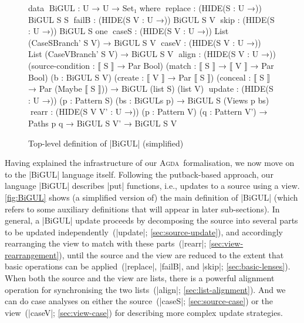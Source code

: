 \documentclass{sigplanconf}
\newcommand{\Agda}{\textsc{Agda}}
\newcommand{\beforefigure}{\setlength{\mathindent}{0em}}
\begin{document}
\begin{figure}
\beforefigure
\begin{code}
data ^^^BiGUL : U → U → Set₁ where
  ^^^replace  :  (HIDE({S : U} →))    BiGUL S S
  ^^^failB    :  (HIDE({S V : U} →))  BiGUL S V
  ^^^skip     :  (HIDE({S : U} →))    BiGUL S one
  ^^^caseS    :  (HIDE({S V : U} →))  List (CaseSBranch'  S V) → BiGUL S V
  ^^^caseV    :  (HIDE({S V : U} →))  List (CaseVBranch'  S V) → BiGUL S V
  ^^^align    :  (HIDE({S V : U} →))  (source-condition : ⟦ S ⟧ → Par Bool)
                                      (match : ⟦ S ⟧ → ⟦ V ⟧ → Par Bool)
                                      (b : BiGUL S V)
                                      (create : ⟦ V ⟧ → Par ⟦ S ⟧)
                                      (conceal : ⟦ S ⟧ → Par (Maybe ⟦ S ⟧)) →
                                      BiGUL (list S) (list V)
  ^^^update   :  (HIDE({S : U} →))    (p : Pattern S) (bs : BiGULs p) →
                                      BiGUL S (Views p bs)
  ^^^rearr    :  (HIDE({S V V' : U} →))  (p : Pattern V) (q : Pattern V') →
                                         Paths p q → BiGUL S V' → BiGUL S V
\end{code}
\caption{Top-level definition of |BiGUL| (simplified)}
\label{fig:BiGUL}
\end{figure}

Having explained the infrastructure of our \Agda\ formalisation, we now move on to the |BiGUL| language itself.
Following the putback-based approach, our language |BiGUL| describes |put| functions, i.e., updates to a source using a view.
\autoref{fig:BiGUL} shows (a simplified version of) the main definition of |BiGUL| (which refers to some auxiliary definitions that will appear in later sub-sections).
In general, a |BiGUL| update proceeds by decomposing the source into several parts to be updated independently~(|update|; \autoref{sec:source-update}), and accordingly rearranging the view to match with these parts~(|rearr|; \autoref{sec:view-rearrangement}), until the source and the view are reduced to the extent that basic operations can be applied~(|replace|, |failB|, and |skip|; \autoref{sec:basic-lenses}).
When both the source and the view are lists, there is a powerful alignment operation for synchronising the two lists~(|align|; \autoref{sec:list-alignment}).
And we can do case analyses on either the source~(|caseS|; \autoref{sec:source-case}) or the view~(|caseV|; \autoref{sec:view-case}) for describing more complex update strategies.
\end{document}
